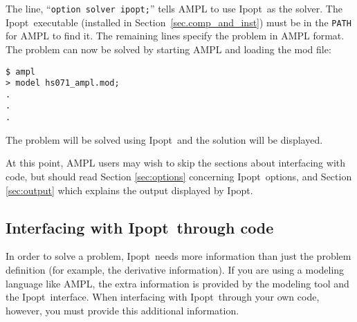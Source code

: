 \documentclass[10pt]{article}
\newcommand{\Ipopt}{{\sc Ipopt}}
\begin{document}
The line, ``{\tt option solver ipopt;}'' tells AMPL to use \Ipopt\ as
the solver. The \Ipopt\ executable (installed in
Section~\ref{sec.comp_and_inst}) must be in the {\tt PATH} for AMPL to
find it. The remaining lines specify the problem in AMPL format. The
problem can now be solved by starting AMPL and loading the mod file:
\begin{verbatim}
$ ampl
> model hs071_ampl.mod;
.
.
.
\end{verbatim}
The problem will be solved using \Ipopt\ and the solution will be
displayed.

At this point, AMPL users may wish to skip the sections about
interfacing with code, but should read Section \ref{sec:options}
concerning \Ipopt\ options, and Section \ref{sec:output} which
explains the output displayed by \Ipopt.

\subsection{Interfacing with \Ipopt\ through code}
In order to solve a problem, \Ipopt\ needs more information than just
the problem definition (for example, the derivative information). If
you are using a modeling language like AMPL, the extra information is
provided by the modeling tool and the \Ipopt\ interface. When
interfacing with \Ipopt\ through your own code, however, you must
provide this additional information.
\end{document}
